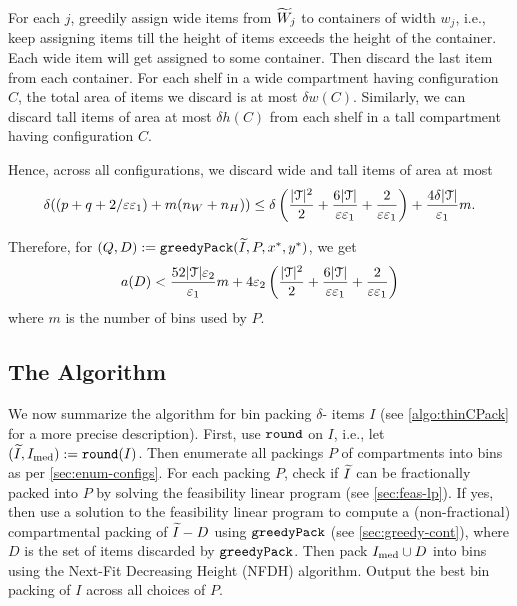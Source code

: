 For each $j$, greedily assign wide items from $\widetilde{W}_j$ to containers of width $w_j$,
i.e., keep assigning items till the height of items exceeds the height of the container.
Each wide item will get assigned to some container.
Then discard the last item from each container.
For each shelf in a wide compartment having configuration $C$,
the total area of items we discard is at most $\delta w(C)$.
Similarly, we can discard tall items of area at most $\delta h(C)$
from each shelf in a tall compartment having configuration $C$.

Hence, across all configurations, we discard wide and tall items of area at most
\[ \delta((p + q + 2/\varepsilon\varepsilon_1) + m(n_W + n_H))
\le \delta\left(\frac{|\mathcal{T}|^2}{2} + \frac{6|\mathcal{T}|}{\varepsilon\varepsilon_1}
    + \frac{2}{\varepsilon\varepsilon_1}\right) + \frac{4\delta|\mathcal{T}|}{\varepsilon_1}m. \]

Therefore, for $(Q, D) := \operatorname{\mathtt{greedyPack}}(\widetilde{I}, P, x^*, y^*)$, we get
\begin{equation}
\label{eqn:greedy-discard-area}
a(D) < \frac{52|\mathcal{T}|\varepsilon_2}{\varepsilon_1} m
    + 4\varepsilon_2\left(\frac{|\mathcal{T}|^2}{2} + \frac{6|\mathcal{T}|}{\varepsilon\varepsilon_1}
        + \frac{2}{\varepsilon\varepsilon_1}\right)
\end{equation}
where $m$ is the number of bins used by $P$.

\subsection{The Algorithm}
\label{sec:thinCPack}

We now summarize the algorithm for bin packing $\delta$-\thin{} items $I$
(see \cref{algo:thinCPack} for a more precise description).
First, use $\operatorname{\mathtt{round}}$ on $I$, i.e., let $(\widetilde{I}, I_{\mathrm{med}}) := \operatorname{\mathtt{round}}(I)$.
Then enumerate all packings $P$ of compartments into bins as per \cref{sec:enum-configs}.
For each packing $P$, check if $\widetilde{I}$ can be fractionally packed into $P$
by solving the feasibility linear program (see \cref{sec:feas-lp}).
If yes, then use a solution to the feasibility linear program to
compute a (non-fractional) compartmental packing of $\widetilde{I} - D$
using $\operatorname{\mathtt{greedyPack}}$ (see \cref{sec:greedy-cont}),
where $D$ is the set of items discarded by $\operatorname{\mathtt{greedyPack}}$.
Then pack $I_{\mathrm{med}} \cup D$ into bins using the Next-Fit Decreasing Height (NFDH) algorithm.
Output the best bin packing of $I$ across all choices of $P$.

